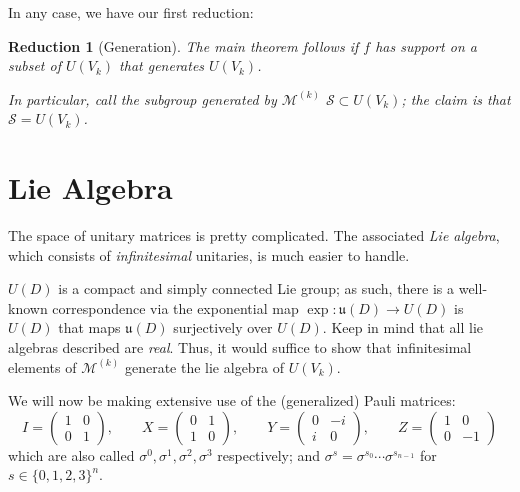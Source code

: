 \documentclass[fleqn,12pt]{article}
\newtheorem{reduction}{Reduction}
\begin{document}
In any case, we have our first reduction:
\begin{reduction}
    [Generation]
    The main theorem follows if $f$ has support on a subset of $U(V_k)$
    that generates $U(V_k)$.

    In particular, call the subgroup generated by $\mathcal{M}^{(k)}$
    $\mathcal{S}\subset U(V_k)$; the claim is that $\mathcal{S} = U(V_k)$.

\end{reduction}

\section{Lie Algebra}

The space of unitary matrices is pretty complicated. The associated \emph{Lie algebra},
which consists of \emph{infinitesimal} unitaries, is much easier to handle.

$U(D)$ is a compact and simply connected Lie group; as such, there is a well-known correspondence
via the exponential map $\exp : \mathfrak{u}(D) \to U(D)$ is $U(D)$
that maps $\mathfrak{u}(D)$ surjectively over $U(D)$. Keep in mind that all lie algebras
described are \emph{real}. Thus, it would suffice to show that infinitesimal elements
of $\mathcal{M}^{(k)}$ generate the
lie algebra of $U(V_k)$.


We will now be making extensive use of the (generalized) Pauli matrices:
\[
    I = \begin{pmatrix}
        1 & 0 \\ 0 & 1
    \end{pmatrix},\qquad
    X = \begin{pmatrix}
        0 & 1 \\ 1 & 0
    \end{pmatrix},\qquad
    Y = \begin{pmatrix}
        0 & -i \\ i & 0
    \end{pmatrix},\qquad
    Z = \begin{pmatrix}
        1 & 0 \\ 0 & -1
    \end{pmatrix}
\]
which are also called $\sigma^0, \sigma^1, \sigma^2, \sigma^3$ respectively;
and $\sigma^s = \sigma^{s_0}\cdots \sigma^{s_{n-1}}$ for $s\in \{0,1,2,3\}^n$.
\end{document}
